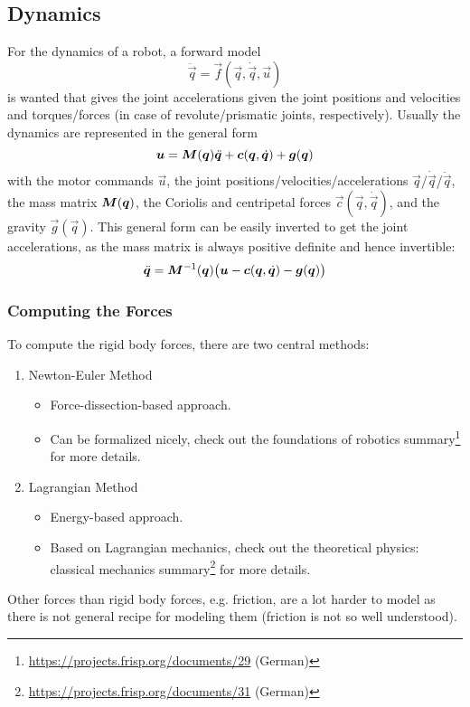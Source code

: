 		\subsection{Dynamics}
			For the dynamics of a robot, a forward model
			\begin{equation*}
				\ddot{\vec{q}} = \vec{f}(\vec{q}, \dot{\vec{q}}, \vec{u})
			\end{equation*}
			is wanted that gives the joint accelerations given the joint positions and velocities and torques/forces (in case of revolute/prismatic joints, respectively). Usually the dynamics are represented in the general form
			\begin{equation}
				\bm{u} = \bm{M}(\bm{q}) \ddot{\bm{q}} + \bm{c}(\bm{q}, \dot{\bm{q}}) + \bm{g}(\bm{q})  \label{eq:dynamicsInverseGeneral}
			\end{equation}
			with the motor commands \(\vec{u}\), the joint positions/velocities/accelerations \(\vec{q}\)/\(\dot{\vec{q}}\)/\(\ddot{\vec{q}}\), the mass matrix \(\bm{M}(\bm{q})\), the Coriolis and centripetal forces \(\vec{c}(\vec{q}, \dot{\vec{q}})\), and the gravity \(\vec{g}(\vec{q})\). This general form can be easily inverted to get the joint accelerations, as the mass matrix is always positive definite and hence invertible:
			\begin{equation}
				\ddot{\bm{q}} = \bm{M}^{-1}(\bm{q}) \big( \bm{u} - \bm{c}(\bm{q}, \dot{\bm{q}}) - \bm{g}(\bm{q}) \big)  \label{eq:dynamicsGeneral}
			\end{equation}

			\subsubsection{Computing the Forces}
				To compute the rigid body forces, there are two central methods:
				\begin{enumerate}
					\item Newton-Euler Method
						\begin{itemize}
							\item Force-dissection-based approach.
							\item Can be formalized nicely, check out the foundations of robotics summary\footnote{\url{https://projects.frisp.org/documents/29} (German)} for more details.
						\end{itemize}
					\item Lagrangian Method
						\begin{itemize}
							\item Energy-based approach.
							\item Based on Lagrangian mechanics, check out the theoretical physics: classical mechanics summary\footnote{\url{https://projects.frisp.org/documents/31} (German)} for more details.
						\end{itemize}
				\end{enumerate}
				Other forces than rigid body forces, e.g. friction, are a lot harder to model as there is not general recipe for modeling them (friction is not so well understood).

